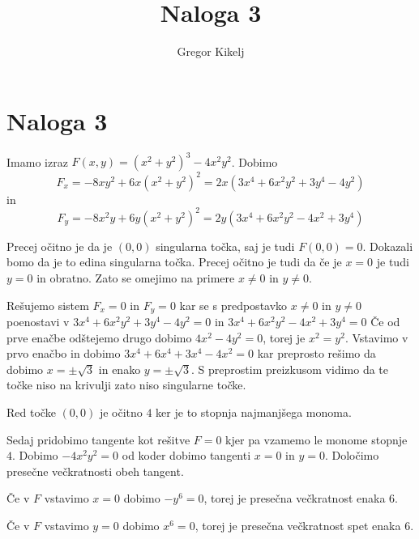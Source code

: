 \documentclass[12pt]{article}
\title{Naloga 3}
\author{Gregor Kikelj}
\begin{document}
\section{Naloga 3}
Imamo izraz $F(x, y)=(x^2+y^2)^3-4x^2y^2$. Dobimo \[F_x=- 8 x y^{2} + 6 x \left(x^{2} + y^{2}\right)^{2}=2 x \left(3 x^{4} + 6 x^{2} y^{2} + 3 y^{4} - 4 y^{2}\right)\]
in \[F_y=- 8 x^{2} y + 6 y \left(x^{2} + y^{2}\right)^{2}=2 y \left(3 x^{4} + 6 x^{2} y^{2} - 4 x^{2} + 3 y^{4}\right)\]

Precej očitno je da je $(0, 0)$ singularna točka, saj je tudi $F(0, 0)=0$. Dokazali bomo da je to edina singularna točka.
Precej očitno je tudi da če je $x=0$ je tudi $y=0$ in obratno. Zato se omejimo na primere 
$x\neq 0$ in $y\neq 0$.

Rešujemo sistem $F_x=0$ in $F_y=0$ kar se s predpostavko $x\neq 0$ in $y\neq 0$ poenostavi v $3 x^{4} + 6 x^{2} y^{2} + 3 y^{4} - 4 y^{2}=0$ in $3 x^{4} + 6 x^{2} y^{2} - 4 x^{2} + 3 y^{4}=0$
Če od prve enačbe odštejemo drugo dobimo $4x^2-4y^2=0$, torej je $x^2=y^2$. Vstavimo v prvo enačbo in dobimo $3x^4+6x^4+3x^4-4x^2=0$ kar preprosto rešimo da dobimo $x=\pm \sqrt{3}$ in enako $y=\pm \sqrt{3}$. 
S preprostim preizkusom vidimo da te točke niso na krivulji zato niso singularne točke.

Red točke $(0, 0)$ je očitno $4$ ker je to stopnja najmanjšega monoma. 

Sedaj pridobimo tangente kot rešitve $F=0$ kjer pa vzamemo le monome stopnje $4$. Dobimo $-4x^2y^2=0$ od koder dobimo tangenti $x=0$ in $y=0$. Določimo presečne večkratnosti obeh tangent.

Če v $F$ vstavimo $x=0$ dobimo $-y^6=0$, torej je presečna večkratnost enaka 6. 

Če v $F$ vstavimo $y=0$ dobimo $x^6=0$, torej je presečna večkratnost spet enaka 6. 
\end{document}
